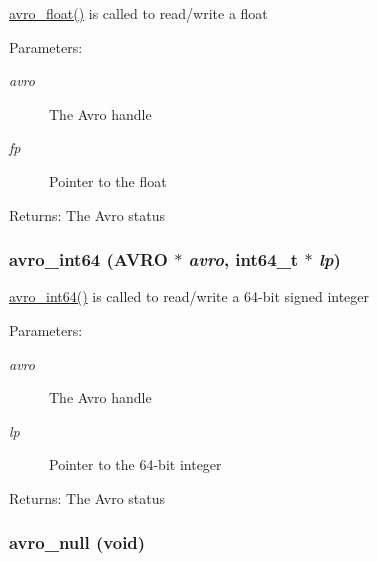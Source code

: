 \hyperlink{group___primitives_ge1346e273aa3d82cc324992f081c6a49}{avro\_\-float()} is called to read/write a float \begin{Desc}
\item[Parameters:]
\begin{description}
\item[{\em avro}]The Avro handle \item[{\em fp}]Pointer to the float \end{description}
\end{Desc}
\begin{Desc}
\item[Returns:]The Avro status \end{Desc}
\hypertarget{group___primitives_gef604d6a5f83d9769b4c5d47e8b505f2}{
\subsubsection[{avro\_\-int64}]{ avro\_\-int64 ({\bf AVRO} $\ast$ {\em avro}, \/  int64\_\-t $\ast$ {\em lp})}}
\label{group___primitives_gef604d6a5f83d9769b4c5d47e8b505f2}


\hyperlink{group___primitives_gef604d6a5f83d9769b4c5d47e8b505f2}{avro\_\-int64()} is called to read/write a 64-bit signed integer \begin{Desc}
\item[Parameters:]
\begin{description}
\item[{\em avro}]The Avro handle \item[{\em lp}]Pointer to the 64-bit integer \end{description}
\end{Desc}
\begin{Desc}
\item[Returns:]The Avro status \end{Desc}
\hypertarget{group___primitives_gad3a89fbddd4853036ed861dba1ee2c1}{
\subsubsection[{avro\_\-null}]{ avro\_\-null (void)}}
\label{group___primitives_gad3a89fbddd4853036ed861dba1ee2c1}


